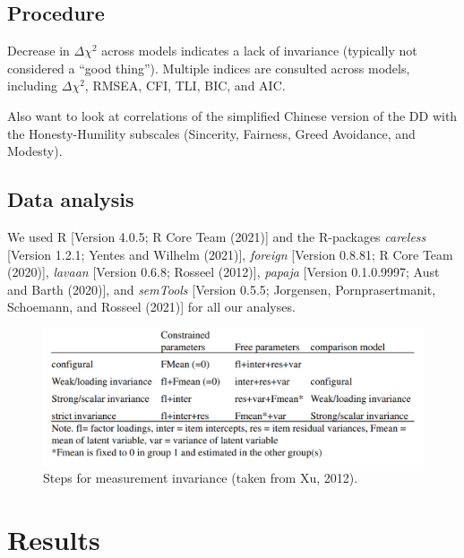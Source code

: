 \documentclass[
  english,
  man]{apa6}
\begin{document}
\hypertarget{procedure}{%
\subsection{Procedure}\label{procedure}}

Decrease in \(\Delta\chi^2\) across models indicates a lack of invariance (typically not considered a ``good thing''). Multiple indices are consulted across models, including \(\Delta\chi^2\), RMSEA, CFI, TLI, BIC, and AIC.

Also want to look at correlations of the simplified Chinese version of the DD with the Honesty-Humility subscales (Sincerity, Fairness, Greed Avoidance, and Modesty).

\hypertarget{data-analysis}{%
\subsection{Data analysis}\label{data-analysis}}

We used R {[}Version 4.0.5; R Core Team (2021){]} and the R-packages \emph{careless} {[}Version 1.2.1; Yentes and Wilhelm (2021){]}, \emph{foreign} {[}Version 0.8.81; R Core Team (2020){]}, \emph{lavaan} {[}Version 0.6.8; Rosseel (2012){]}, \emph{papaja} {[}Version 0.1.0.9997; Aust and Barth (2020){]}, and \emph{semTools} {[}Version 0.5.5; Jorgensen, Pornprasertmanit, Schoemann, and Rosseel (2021){]} for all our analyses.

\begin{figure}
\includegraphics[width=4.71in]{steps} \caption{Steps for measurement invariance (taken from Xu, 2012).}\label{fig:figure1}
\end{figure}

\hypertarget{results}{%
\section{Results}\label{results}}
\end{document}
